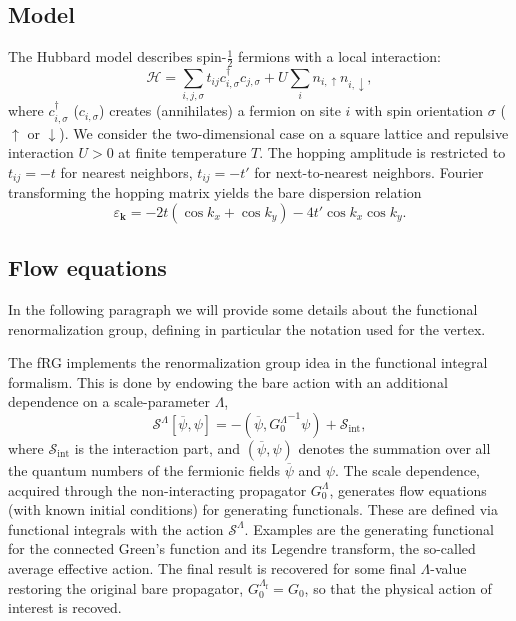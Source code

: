 
\subsection{Model}

The Hubbard model\cite{Hubbard1963} describes spin-$\frac{1}{2}$ fermions with a local interaction:
\begin{equation}
 \mathcal{H} = \sum_{i,j,\sigma} t_{ij} c^{\dagger}_{i,\sigma} c_{j,\sigma}
 + U \sum_{i} n_{i,\uparrow} n_{i,\downarrow} ,
\end{equation}
where $c^{\dagger}_{i,\sigma}$ ($c_{i,\sigma}$)  creates (annihilates) a fermion on site $i$ with spin orientation $\sigma$ ($\uparrow$ or $\downarrow$). We consider the two-dimensional case on a square lattice and repulsive interaction $U>0$ at finite temperature $T$. The hopping amplitude is restricted to $t_{ij} = -t$ for nearest neighbors, $t_{ij}=-t'$ for next-to-nearest neighbors. Fourier transforming the hopping matrix yields the bare dispersion relation
\begin{equation}
 \varepsilon_{\mathbf{k}} =
 -2t \left( \cos{k_x} + \cos{k_y} \right) -4 t' \cos{k_x} \cos{k_y} .
\end{equation}


\subsection{Flow equations}

In the following paragraph we will provide some details about the functional renormalization group,\cite{Metzner2012,Platt2013} defining in particular the notation used for the vertex. 

The fRG implements the renormalization group idea in the functional integral formalism. 
This is done by endowing the bare action with an additional dependence on a scale-parameter $\Lambda$,\cite{Metzner2012,Platt2013} 
\begin{equation}
 \mathcal{S}^\Lambda[\overline\psi,\psi] =
 -(\overline\psi,{G_0^\Lambda}^{-1}\psi)+\mathcal{S}_{\mathrm{int}},  
\end{equation} 
where $\mathcal{S}_{\mathrm{int}}$ is the interaction part, and $(\overline\psi,\psi)$ denotes the summation over all the quantum numbers of the fermionic fields  $\overline \psi$ and $\psi$. 
The scale dependence, acquired through the non-interacting propagator $G_0^\Lambda$, generates flow equations (with known initial conditions) for generating functionals. These are defined via functional integrals with the action $\mathcal{S}^\Lambda$. 
Examples are the generating functional for the connected Green's function and its Legendre transform, the so-called average effective action.\cite{Wetterich1993}
The final result is recovered for some final $\Lambda$-value restoring the original bare propagator, $G_0^{\Lambda_\mathrm{f}} = G_0$, so that the physical action of interest is recoved.  

